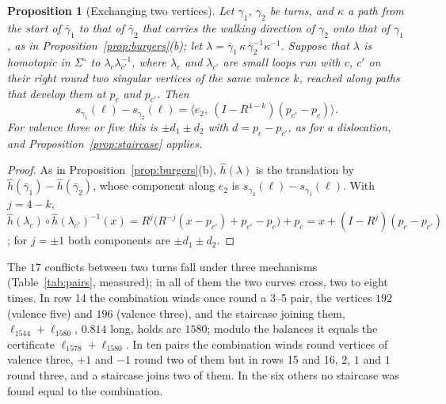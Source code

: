 \documentclass[11pt,a4paper]{article}
\newtheorem{proposition}{Proposition}
\newcommand{\shift}{s}
\newcommand{\lean}[1]{\texttt{\detokenize{#1}}}
\newenvironment{evidence}[3][]{}{}
\begin{document}
\begin{evidence}{core}{\lean{Motion.exchange}, \lean{exchange_quarter}; assumed: the homotopy between the loops}
\begin{proposition}[Exchanging two vertices]\label{prop:swap}
Let $\gamma_1$, $\gamma_2$ be turns, and $\kappa$ a path from the start of
$\bar\gamma_1$ to that of $\bar\gamma_2$ that carries the walking direction of
$\gamma_2$ onto that of $\gamma_1$, as in Proposition~\ref{prop:burgers}(b);
let $\lambda = \bar\gamma_1\, \kappa\, \bar\gamma_2^{-1} \kappa^{-1}$.
Suppose that $\lambda$ is homotopic in $\Sigma^\circ$ to $\lambda_c
\lambda_{c'}^{-1}$, where $\lambda_c$ and $\lambda_{c'}$ are small loops run
with $c$, $c'$ on their right round two singular vertices of the same valence
$k$, reached along paths that develop them at $p_c$ and $p_{c'}$. Then
\[
  \shift_{\gamma_1}(\ell) - \shift_{\gamma_2}(\ell) = \bigl\langle e_2,\
  (I - R^{4-k})(p_{c'} - p_c) \bigr\rangle .
\]
For valence three or five this is $\pm d_1 \pm d_2$ with $d = p_c - p_{c'}$,
as for a dislocation, and Proposition~\ref{prop:staircase} applies.
\end{proposition}
\end{evidence}

\begin{proof}
As in Proposition~\ref{prop:burgers}(b), $\hat h(\lambda)$ is the translation by
$\hat h(\bar\gamma_1) - \hat h(\bar\gamma_2)$, whose component along $e_2$
is $\shift_{\gamma_2}(\ell) - \shift_{\gamma_1}(\ell)$. With $j = 4 - k$, $\hat
h(\lambda_c) \circ \hat h(\lambda_{c'})^{-1}(x) = R^j\bigl(R^{-j}(x - p_{c'}) +
p_{c'} - p_c\bigr) + p_c = x + (I - R^j)(p_c - p_{c'})$; for $j = \pm1$ both
components are $\pm d_1 \pm d_2$.
\end{proof}

The $17$ conflicts between two turns fall under three mechanisms
(Table~\ref{tab:pairs}, measured); in all of them the two curves cross, two
to eight times. In row 14 the combination winds once round a 3--5 pair, the
vertices $192$ (valence five) and $196$ (valence three), and the staircase
joining them, $\ell_{1544} + \ell_{1580}$, $0.814$ long, holds arc $1580$;
modulo the balances it equals the certificate $\ell_{1578} + \ell_{1580}$. In
ten pairs the combination winds round vertices of valence three, $+1$ and $-1$
round two of them but in rows 15 and 16, $2$, $1$ and $1$ round three, and a
staircase joins two of them. In the six others no staircase was found equal
to the combination.
\end{document}
